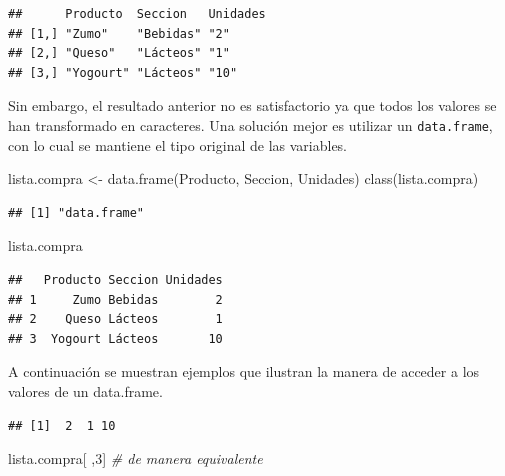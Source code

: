 \documentclass[
]{book}
\newenvironment{Shaded}{\begin{snugshade}}{\end{snugshade}}
\newcommand{\CommentTok}[1]{\textcolor[rgb]{0.56,0.35,0.01}{\textit{#1}}}
\newcommand{\DecValTok}[1]{\textcolor[rgb]{0.00,0.00,0.81}{#1}}
\newcommand{\FunctionTok}[1]{\textcolor[rgb]{0.00,0.00,0.00}{#1}}
\newcommand{\NormalTok}[1]{#1}
\newcommand{\OtherTok}[1]{\textcolor[rgb]{0.56,0.35,0.01}{#1}}
\newcommand{\SpecialCharTok}[1]{\textcolor[rgb]{0.00,0.00,0.00}{#1}}
\theoremstyle{break}
\theoremstyle{nonumberplain}
\begin{document}
\begin{verbatim}
##      Producto  Seccion   Unidades
## [1,] "Zumo"    "Bebidas" "2"     
## [2,] "Queso"   "Lácteos" "1"     
## [3,] "Yogourt" "Lácteos" "10"
\end{verbatim}

Sin embargo, el resultado anterior no es satisfactorio ya que todos los valores se han transformado en caracteres.
Una solución mejor es utilizar un \texttt{data.frame}, con lo cual se mantiene el tipo original de las variables.

\begin{Shaded}
\begin{Highlighting}[]
\NormalTok{lista.compra }\OtherTok{\textless{}{-}} \FunctionTok{data.frame}\NormalTok{(Producto, Seccion, Unidades)}
\FunctionTok{class}\NormalTok{(lista.compra)}
\end{Highlighting}
\end{Shaded}

\begin{verbatim}
## [1] "data.frame"
\end{verbatim}

\begin{Shaded}
\begin{Highlighting}[]
\NormalTok{lista.compra}
\end{Highlighting}
\end{Shaded}

\begin{verbatim}
##   Producto Seccion Unidades
## 1     Zumo Bebidas        2
## 2    Queso Lácteos        1
## 3  Yogourt Lácteos       10
\end{verbatim}

A continuación se muestran ejemplos que ilustran la manera de acceder a los valores de un data.frame.

\begin{Shaded}
\end{Shaded}

\begin{verbatim}
## [1]  2  1 10
\end{verbatim}

\begin{Shaded}
\begin{Highlighting}[]
\NormalTok{lista.compra[ ,}\DecValTok{3}\NormalTok{]  }\CommentTok{\# de manera equivalente}
\end{Highlighting}
\end{Shaded}
\end{document}
